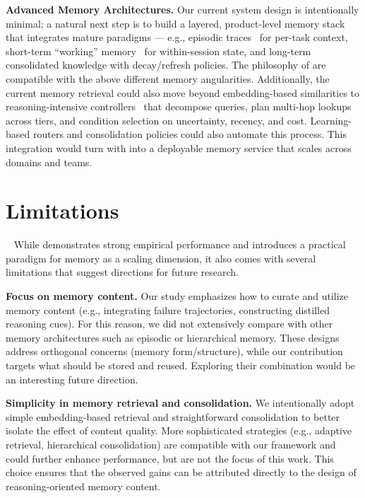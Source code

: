 \noindent\textbf{Advanced Memory Architectures.} 
Our current system design is intentionally minimal; a natural next step is to build a layered, product-level memory stack that integrates mature paradigms --- e.g., episodic traces~\citep{fountas2025humaninspired} for per-task context, short-term ``working'' memory~\citep{lumer2025memtool} for within-session state, and long-term~\citep{wang2025m} consolidated knowledge with decay/refresh policies. The philosophy of \ours{} are compatible with the above different memory angularities. 
Additionally, the current memory retrieval could also move beyond embedding-based similarities to reasoning-intensive controllers~\citep{shao2025reasonir} that decompose queries, plan multi-hop lookups across tiers, and condition selection on uncertainty, recency, and cost. Learning-based routers and consolidation policies could also automate this process. This integration would turn \ours{} with \mats{} into a deployable memory service that scales across domains and teams.



\section{Limitations}~\label{app: limitation}
While \ours{} demonstrates strong empirical performance and introduces a practical paradigm for memory as a scaling dimension, it also comes with several limitations that suggest directions
for future research.

\noindent\textbf{Focus on memory content.} Our study emphasizes how to curate and utilize memory content (e.g., integrating failure trajectories, constructing distilled reasoning cues). For this reason, we did not extensively compare with other memory architectures such as episodic or hierarchical memory. These designs address orthogonal concerns (memory form/structure), while our contribution targets what should be stored and reused. Exploring their combination would be an interesting future direction.

\noindent\textbf{Simplicity in memory retrieval and consolidation.} We intentionally adopt simple embedding-based retrieval and straightforward consolidation to better isolate the effect of content quality. More sophisticated strategies (e.g., adaptive retrieval, hierarchical consolidation) are compatible with our framework and could further enhance performance, but are not the focus of this work. This choice ensures that the observed gains can be attributed directly to the design of reasoning-oriented memory content.


